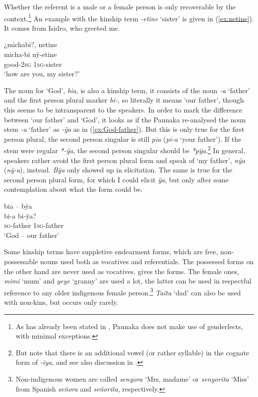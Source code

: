 Whether the referent is a male or a female person is only recoverable by the context.\footnote{As has already been stated in , Paunaka does not make use of genderlects, with minimal exceptions.} An example with the kinship term \textit{-etine} ‘sister’ is given in (\ref{ex:netine}). It comes from Isidro, who greeted me.

\ea\label{ex:netine}
\begingl 
\glpreamble ¿michabi?, netine\\
\gla micha-bi nÿ-etine\\ 
\glb good-2\textsc{sg} 1\textsc{sg}-sister\\ 
\glft ‘how are you, my sister?’
\trailingcitation{[mdx-c120416ls.008]}
\xe

\largerpage
The noun for ‘God’, \textit{bia}, is also a kinship term, it consists of the noun \textit{-a} ‘father’ and the first person plural marker \textit{bi-}, so literally it means ‘our father’, though this seems to be intransparent to the speakers. In order to mark the difference between ‘our father’ and ‘God’, it looks as if the Paunaka re-analysed the noun stem \textit{-a} ‘father’ as \textit{-ÿa} as in (\ref{ex:God-father}). But this is only true for the first person plural, the second person singular is still \textit{pia} (\textit{pi-a} ‘your father’). If the stem were regular \textit{*-ÿa}, the second person singular should be \textit{*pÿa}.\footnote{But note that there is an additional vowel (or rather syllable) in the cognate form of  \textit{-iya}, and see also discussion in .} In general, speakers rather avoid the first person plural form and speak of ‘my father’, \textit{nÿa} (\textit{nÿ-a}), instead. \textit{Bÿa} only showed up in elicitation. The same is true for the second person plural form, for which I could elicit \textit{ÿa}, but only after some contemplation about what the form could be.

\ea\label{ex:God-father}
\begingl 
\glpreamble bia – bÿa\\
\gla bi-a bi-ÿa?\\ 
\textsc{sg}-father 1\textsc{sg}-father\\ 
\glft ‘God – our father’
\xe


Some kinship terms have suppletive endearment forms,  which are free, non-possess\-able nouns used both as vocatives and referentials. The possessed forms on the other hand are never used as vocatives.  gives the forms.
The female ones, \textit{mimi} ‘mum’ and \textit{yeye} ‘granny’ are used a lot, the latter can be used in respectful reference to any older indigenous female person.\footnote{Non-indigenous women are called \textit{senyora} ‘Mrs, madame’ or \textit{senyorita} ‘Miss’ from Spanish \textit{señora} and \textit{señorita}, respectively.} \textit{Taita} ‘dad’ can also be used with non-kins, but occurs only rarely.

